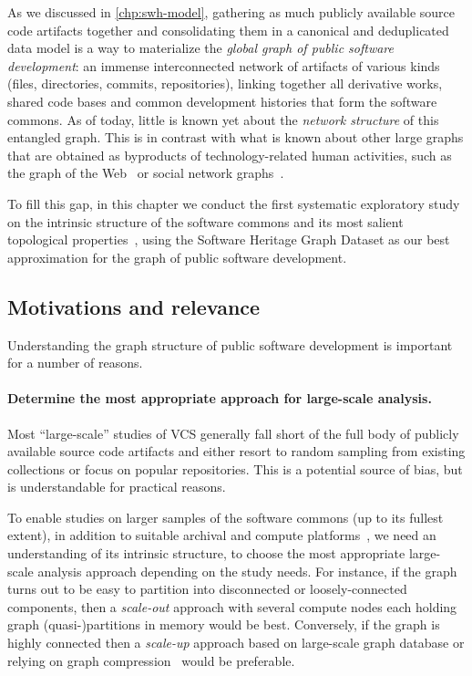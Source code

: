 As we discussed in \cref{chp:swh-model}, gathering as much publicly available
source code artifacts together and consolidating them in a canonical and
deduplicated data model is a way to materialize the \emph{global graph of
public software development}: an immense interconnected network of artifacts of
various kinds (files, directories, commits, repositories), linking together all
derivative works, shared code bases and common development histories that
form the software commons. As of today, little is known yet about the
\emph{network structure} of this entangled graph. This is in contrast with what
is known about other large graphs that are obtained as byproducts of
technology-related human activities, such as the graph of the
Web~\cite{vigna2015webstruct} or social network
graphs~\cite{ugander2011facebook, myers2014twitter}.

To fill this gap, in this chapter we conduct the first systematic exploratory
study on the intrinsic structure of the software commons and its most salient
topological properties~\cite{barabasi2002networkstats}, using the Software
Heritage Graph Dataset as our best approximation for the graph of public
software development.

\subsection{Motivations and relevance}

Understanding the graph structure of public software development is important
for a number of reasons.

\paragraph{Determine the most appropriate approach for large-scale analysis.}

Most ``large-scale'' studies of VCS generally fall short of the full body of
publicly available source code artifacts and either resort to random sampling
from existing collections or focus on popular repositories. This is a potential
source of bias, but is understandable for practical reasons.

To enable studies on larger samples of the software commons (up to its fullest
extent), in addition to suitable archival and compute
platforms~\cite{dyer2013boa, swhcacm2018, mockus2019woc}, we need an
understanding of its intrinsic
structure, to choose the most appropriate large-scale analysis approach
depending on the study needs.  For instance, if the graph turns out to be easy
to partition into disconnected or loosely-connected components, then a
\emph{scale-out} approach with several compute nodes each holding graph
(quasi-)partitions in memory would be best. Conversely, if the graph is
highly connected then a \emph{scale-up} approach based on large-scale graph
database or relying on graph compression~\cite{saner-2020-swh-graph} would be
preferable.


